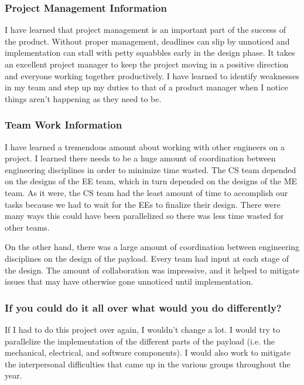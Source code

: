 \subsubsection{Project Management Information}
I have learned that project management is an important part of the success of
the product.
Without proper management, deadlines can slip by unnoticed and implementation
can stall with petty squabbles early in the design phase.
It takes an excellent project manager to keep the project moving in a positive
direction and everyone working together productively.
I have learned to identify weaknesses in my team and step up my duties to that
of a product manager when I notice things aren't happening as they need to be.

\subsubsection{Team Work Information}
I have learned a tremendous amount about working with other engineers on a
project.
I learned there needs to be a huge amount of coordination between engineering
disciplines in order to minimize time wasted.
The CS team depended on the designs of the EE team, which in turn depended on
the designs of the ME team.
As it were, the CS team had the least amount of time to accomplish our tasks
because we had to wait for the EEs to finalize their design.
There were many ways this could have been parallelized so there was less time
wasted for other teams.

On the other hand, there was a large amount of coordination between engineering
disciplines on the design of the \gls{payload}.
Every team had input at each stage of the design.
The amount of collaboration was impressive, and it helped to mitigate issues
that may have otherwise gone unnoticed until implementation.

\subsubsection{If you could do it all over what would you do differently?}
If I had to do this project over again, I wouldn't change a lot.
I would try to parallelize the implementation of the different parts of the 
\gls{payload} (i.e. the mechanical, electrical, and software components).
I would also work to mitigate the interpersonal difficulties that came up in
the various groups throughout the year.
